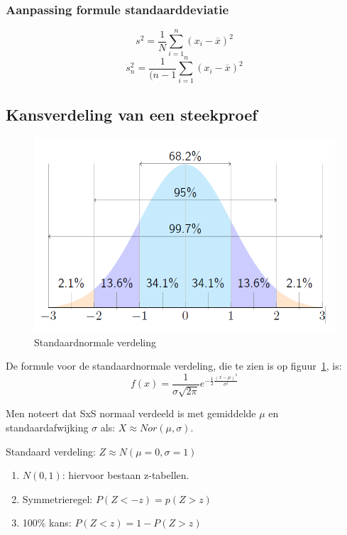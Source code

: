 \documentclass[a4paper,12pt]{article}
\begin{document}
\subsubsection{Aanpassing formule standaarddeviatie}
\begin{equation}
s^2=\frac{1}{N} \sum_{i=1}^n (x_i - \overline{x})^2
\end{equation}
\begin{equation}
s^2_n=\frac{1}{(n-1} \sum_{i=1}^n (x_i - \overline{x})^2
\end{equation}
\subsection{Kansverdeling van een steekproef}
\begin{figure}[H]
\centering
\includegraphics[width=.9\textwidth]
{img/Hoofdstuk_4/GaussCurve.png}
\caption{Standaardnormale verdeling}
\label{fig:GaussCurve}
\end{figure}

De formule voor de standaardnormale verdeling, die te zien is op figuur~\ref{fig:GaussCurve}, is:
\begin{equation}
f(x) = \frac{1}{\sigma \sqrt{2 \pi}} e^{-\frac{1}{2}\frac{(x - \mu)^2}{\sigma^2}}
\end{equation}

Men noteert dat SxS normaal verdeeld is met gemiddelde $\mu$ en standaardafwijking $\sigma$ als: $X \approx Nor(\mu, \sigma)$.

Standaard verdeling: $Z \approx N(\mu = 0, \sigma = 1)$

\begin{enumerate}
\item $N(0,1)$: hiervoor bestaan z-tabellen.
\item Symmetrieregel: $P(Z < -z) = p(Z > z)$
\item 100\% kans: $P(Z < z) = 1- P(Z >z)$
\end{enumerate}
\end{document}
